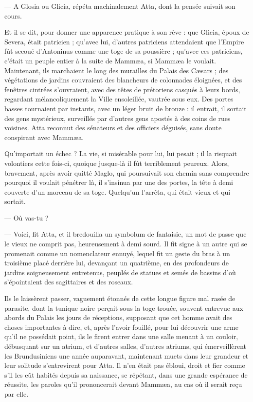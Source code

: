 \documentclass[a4paper, 11pt, oneside, polutonikogreek, french]{article}
\begin{document}
--- A Glosia ou Glicia, répéta machinalement Atta, dont la pensée suivait son cours.

Et il se dit, pour donner une apparence pratique à son rêve : que Glicia, époux de Severa, était patricien ; qu'avec lui, d'autres patriciens attendaient que l'Empire fût secoué d'Antoninus comme une toge de sa poussière ; qu'avec ces patriciens, c'était un peuple entier à la suite de Mammæa, si Mammæa le voulait. Maintenant, ils marchaient le long des murailles du Palais des Cæsars ; des végétations de jardins couvraient des blancheurs de colonnades éloignées, et des fenêtres cintrées s'ouvraient, avec des têtes de prétoriens casqués à leurs bords, regardant mélancoliquement la Ville ensoleillée, vautrée sous eux. Des portes basses tournaient par instants, avec un léger bruit de bronze : il entrait, il sortait des gens mystérieux, surveillés par d'autres gens apostés à des coins de rues voisines. Atta reconnut des sénateurs et des officiers déguisés, sans doute conspirant avec Mammæa.

Qu'importait un échec ? La vie, si misérable pour lui, lui pesait ; il la risquait volontiers cette fois-ci, quoique jusque-là il fût terriblement peureux. Alors, bravement, après avoir quitté Maglo, qui poursuivait son chemin sans comprendre pourquoi il voulait pénétrer là, il s'insinua par une des portes, la tête à demi couverte d'un morceau de sa toge. Quelqu'un l'arrêta, qui était vieux et qui sortait.

--- Où vas-tu ?

--- Voici, fit Atta, et il bredouilla un symbolum de fantaisie, un mot de passe que le vieux ne comprit pas, heureusement à demi sourd. Il fit signe à un autre qui se promenait comme un nomenclateur ennuyé, lequel fit un geste du bras à un troisième placé derrière lui, devançant un quatrième, en des profondeurs de jardins soigneusement entretenus, peuplés de statues et semés de bassins d'où s'épointaient des sagittaires et des roseaux.

Ils le laissèrent passer, vaguement étonnés de cette longue figure mal rasée de parasite, dont la tunique noire perçait sous la toge trouée, souvent entrevue aux abords du Palais les jours de réceptions, supposant que cet homme avait des choses importantes à dire, et, après l'avoir fouillé, pour lui découvrir une arme qu'il ne possédait point, ils le firent entrer dans une salle menant à un couloir, débusquant sur un atrium, et d'autres salles, d'autres atriums, qui émerveillèrent les Brundusiniens une année auparavant, maintenant muets dans leur grandeur et leur solitude s'entrevirent pour Atta. Il n'en était pas ébloui, droit et fier comme s'il les eût habités depuis sa naissance, se répétant, dans une grande espérance de réussite, les paroles qu'il prononcerait devant Mammæa, au cas où il serait reçu par elle.
\end{document}
